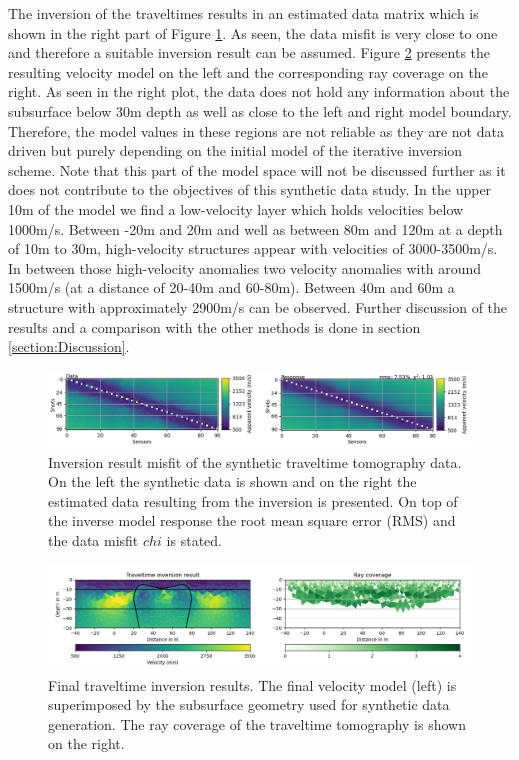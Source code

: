 The inversion of the traveltimes results in an estimated data matrix which is shown in the right part of Figure \ref{figure:TT_inversion_misfits}. As seen, the data misfit is very close to one and therefore a suitable inversion result can be assumed. Figure \ref{figure:TT_inversion_comp} presents the resulting velocity model on the left and the corresponding ray coverage on the right. As seen in the right plot, the data does not hold any information about the subsurface below 30m depth as well as close to the left and right model boundary. Therefore, the model values in these regions are not reliable as they are not data driven but purely depending on the initial model of the iterative inversion scheme. Note that this part of the model space will not be discussed further as it does not contribute to the objectives of this synthetic data study. In the upper 10m of the model we find a low-velocity layer which holds velocities below 1000m/s. Between -20m and 20m and well as between 80m and 120m at a depth of 10m to 30m, high-velocity structures appear with velocities of 3000-3500m/s. In between those high-velocity anomalies two velocity anomalies with around 1500m/s (at a distance of 20-40m and 60-80m). Between 40m and 60m a structure with approximately 2900m/s can be observed. Further discussion of the results and a comparison with the other methods is done in section \ref{section:Discussion}.

\begin{figure}[]
  \centering
    \includegraphics[width=\textwidth]{Figures/TT_RF_labels.png}
    \caption[Traveltime inversion result misfit]{Inversion result misfit of the synthetic traveltime tomography data. On the left the synthetic data is shown and on the right the estimated data resulting from the inversion is presented. On top of the inverse model response the root mean square error (RMS) and the data misfit $chi$ is stated.}
    \label{figure:TT_inversion_misfits}
\end{figure}


\begin{figure}[]
  \centering
    \includegraphics[width=\textwidth]{Figures/TT_comp.png}
    \caption[Final velocity model after inversion]{Final traveltime inversion results. The final velocity model (left) is superimposed by the subsurface geometry used for synthetic data generation. The ray coverage of the traveltime tomography is shown on the right.}
    \label{figure:TT_inversion_comp}
\end{figure}

